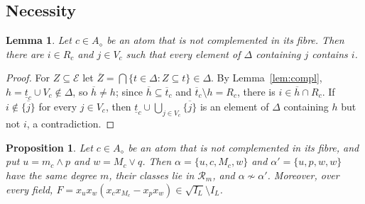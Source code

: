 \documentclass{amsart}
\newtheorem{lemma}[theorem]{Lemma}
\newtheorem{proposition}[theorem]{Proposition}
\theoremstyle{definition}
\newcommand{\cE}{\mathcal E}
\newcommand{\dm}{\diamond}
\newcommand{\lt}{\underline{t}}
\newcommand{\ut}{\overline{t}}
\begin{document}
\subsection{Necessity}\label{subsec:nec}

\begin{lemma}\label{lem:ij}
Let $c\in A_\dm$ be an atom that is not complemented in its fibre. Then there are $i\in R_c$ and $j\in V_c$ such that every element of $\Delta$ containing $j$ contains $i$.
\end{lemma}

\begin{proof}
For $Z\subseteq\cE$ let $\overline Z=\bigcap\{t\in\Delta:Z\subseteq t\}\in\Delta$. By Lemma~\ref{lem:compl}, $h=\lt_c\cup V_c\notin\Delta$, so $\overline h\ne h$; since $\overline h\subseteq\ut_c$ and $\ut_c\setminus h=R_c$, there is $i\in\overline h\cap R_c$. If $i\notin\overline{\{j\}}$ for every $j\in V_c$, then $\lt_c\cup\bigcup_{j\in V_c}\overline{\{j\}}$ is an element of $\Delta$ containing $h$ but not $i$, a contradiction.
\end{proof}

\begin{proposition}\label{prop:witness}
Let $c\in A_\dm$ be an atom that is not complemented in its fibre, and put $u=m_c\wedge p$ and $w=M_c\vee q$. Then $\alpha=\{u,c,M_c,w\}$ and $\alpha'=\{u,p,w,w\}$ have the same degree $m$, their classes lie in $\mathcal R_m$, and $\alpha\not\sim\alpha'$. Moreover, over every field, $F=x_ux_w(x_cx_{M_c}-x_px_w)\in\sqrt{I_L}\setminus I_L$.
\end{proposition}
\end{document}
